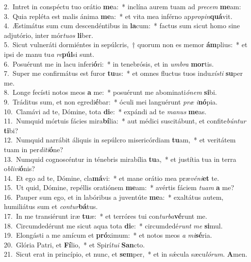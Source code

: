 {2.~}Intret in conspéctu tuo orátio \textbf{me}a:~* inclína aurem tuam ad \textit{pre}\textit{cem} \textbf{me}am:\\
{3.~}Quia repléta est malis ánima \textbf{me}a:~* et vita mea inférno ap\textit{pro}\textit{pin}\textbf{quá}vit.\\
{4.~}Æstimátus sum cum descendéntibus in \textbf{la}cum:~* factus sum sicut homo sine adjutório, inter mór\textit{tu}\textit{os} \textbf{li}ber.\\
{5.~}Sicut vulneráti dormiéntes in sepúlcris,~† quorum non es memor \textbf{ám}plius:~* et ipsi de manu tu\textit{a} \textit{re}\textbf{púl}si sunt.\\
{6.~}Posuérunt me in lacu inferi\textbf{ó}ri:~* in tenebrósis, et in \textit{um}\textit{bra} \textbf{mor}tis.\\
{7.~}Super me confirmátus est furor \textbf{tu}us:~* et omnes fluctus tuos indu\textit{xí}\textit{sti} \textbf{su}per me.\\
{8.~}Longe fecísti notos meos \textbf{a} me:~* posuérunt me abominati\textit{ó}\textit{nem} \textbf{si}bi.\\
{9.~}Tráditus sum, et non egredi\textbf{é}bar:~* óculi mei languérunt \textit{præ} \textit{i}\textbf{nó}pia.\\
{10.~}Clamávi ad te, Dómine, tota \textbf{di}e:~* expándi ad te \textit{ma}\textit{nus} \textbf{me}as.\\
{11.~}Numquid mórtuis fácies mira\textbf{bí}lia:~* aut médici suscitábunt, et confite\textit{bún}\textit{tur} \textbf{ti}bi?\\
{12.~}Numquid narrábit áliquis in sepúlcro misericórdiam \textbf{tu}am,~* et veritátem tuam in per\textit{di}\textit{ti}\textbf{ó}ne?\\
{13.~}Numquid cognoscéntur in ténebris mirabília \textbf{tu}a,~* et justítia tua in terra o\textit{bli}\textit{vi}\textbf{ó}nis?\\
{14.~}Et ego ad te, Dómine, cla\textbf{má}vi:~* et mane orátio mea præ\textit{vé}\textit{ni}\textbf{et} te.\\
{15.~}Ut quid, Dómine, repéllis oratiónem \textbf{me}am:~* avértis fáciem \textit{tu}\textit{am} \textbf{a} me?\\
{16.~}Pauper sum ego, et in labóribus a juventúte \textbf{me}a:~* exaltátus autem, humiliátus sum et \textit{con}\textit{tur}\textbf{bá}tus.\\
{17.~}In me transiérunt iræ \textbf{tu}æ:~* et terróres tui con\textit{tur}\textit{ba}\textbf{vé}runt me.\\
{18.~}Circumdedérunt me sicut aqua tota \textbf{di}e:~* circumdedé\textit{runt} \textit{me} \textbf{si}mul.\\
{19.~}Elongásti a me amícum et \textbf{pró}ximum:~* et notos meos \textit{a} \textit{mi}\textbf{sé}ria.\\
{20.~}Glória Patri, et \textbf{Fí}lio,~* et Spirí\textit{tu}\textit{i} \textbf{San}cto.\\
{21.~}Sicut erat in princípio, et nunc, et \textbf{sem}per,~* et in sǽcula sæcu\textit{ló}\textit{rum}. \textbf{A}men.\\
